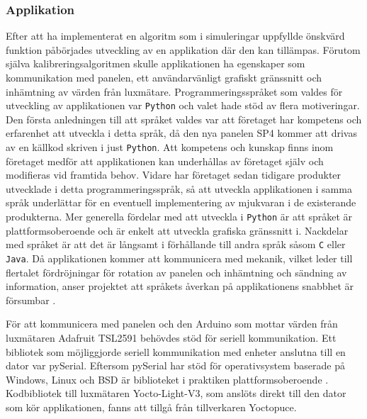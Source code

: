 
        \subsubsection{Applikation} %
        \label{ssub:utveckling_av_applikation}
            Efter att ha implementerat en algoritm som i simuleringar uppfyllde önskvärd funktion påbörjades utveckling av en applikation där den kan tillämpas. Förutom själva kalibreringsalgoritmen skulle applikationen ha egenskaper som kommunikation med panelen, ett användarvänligt grafiskt gränssnitt och inhämtning av värden från luxmätare. Programmeringsspråket som valdes för utveckling av applikationen var \texttt{Python} och valet hade stöd av flera motiveringar. Den första anledningen till att språket valdes var att företaget har kompetens och erfarenhet att utveckla i detta språk, då den nya panelen SP4 kommer att drivas av en källkod skriven i just \texttt{Python}. Att kompetens och kunskap finns inom företaget medför att applikationen kan underhållas av företaget själv och modifieras vid framtida behov. Vidare har företaget sedan tidigare produkter utvecklade i detta programmeringsspråk, så att utveckla applikationen i samma språk underlättar för en eventuell implementering av mjukvaran i de existerande produkterna. Mer generella fördelar med att utveckla i \texttt{Python} är att språket är plattformsoberoende och är enkelt att utveckla grafiska gränssnitt i. Nackdelar med språket är att det är långsamt i förhållande till andra språk såsom \texttt{C} eller \texttt{Java}. Då applikationen kommer att kommunicera med mekanik, vilket leder till flertalet fördröjningar för rotation av panelen och inhämtning och sändning av information, anser projektet att språkets åverkan på applikationens snabbhet är försumbar \cite{python_speed}. \bigskip

            \newpage

            För att kommunicera med panelen och den Arduino som mottar värden från luxmätaren Adafruit TSL2591 behövdes stöd för seriell kommunikation. Ett bibliotek som möjliggjorde seriell kommunikation med enheter anslutna till en dator var pySerial. Eftersom pySerial har stöd för operativsystem baserade på Windows, Linux och BSD är biblioteket i praktiken plattformsoberoende \cite{pyserial}. 
            Kodbibliotek till luxmätaren Yocto-Light-V3, som anslöts direkt till den dator som kör applikationen, fanns att tillgå från tillverkaren Yoctopuce. \bigskip

